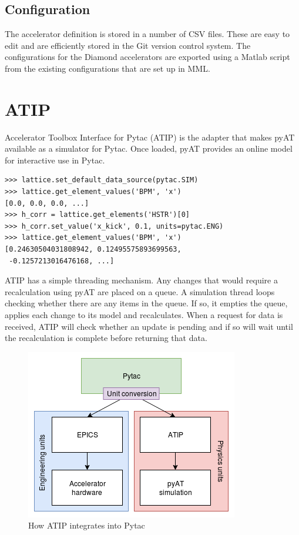 \documentclass[a4paper,
               keeplastbox,   %
               ]{jacow}
\begin{document}
\subsection{Configuration}

The accelerator definition is stored in a number of CSV files. These are easy
to edit and are efficiently stored in the Git version control system. The
configurations for the Diamond accelerators are exported using a Matlab script
from the existing configurations that are set up in MML.

\section{ATIP}

Accelerator Toolbox Interface for Pytac (ATIP) is the adapter that makes pyAT
available as a simulator for Pytac. Once loaded, pyAT provides an online model
for interactive use in Pytac.

\begin{lstlisting}
>>> lattice.set_default_data_source(pytac.SIM)
>>> lattice.get_element_values('BPM', 'x')
[0.0, 0.0, 0.0, ...]
>>> h_corr = lattice.get_elements('HSTR')[0]
>>> h_corr.set_value('x_kick', 0.1, units=pytac.ENG)
>>> lattice.get_element_values('BPM', 'x')
[0.24630504031808942, 0.12495575893699563, 
 -0.1257213016476168, ...]
\end{lstlisting}

ATIP has a simple threading mechanism. Any changes that would require a recalculation
using pyAT are placed on a queue. A simulation thread loops checking whether there
are any items in the queue. If so, it empties the queue, applies each change to its
model and recalculates. When a request for data is received, ATIP will check whether
an update is pending and if so will wait until the recalculation is complete before
returning that data.

\begin{figure}[!hbt]
    \centering
    \includegraphics*[width=\columnwidth]{MOPHA017f1}

    \caption{How ATIP integrates into Pytac}
    \label{fig:atip}
\end{figure}
\end{document}
